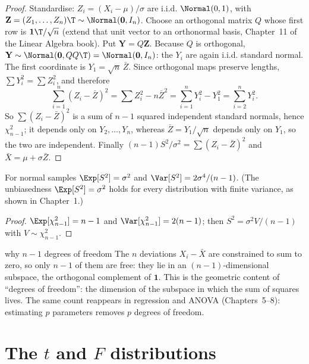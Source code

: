 \begin{proof}
Standardise: $Z_i=(X_i-\mu)/\sigma$ are i.i.d. $\Normal(0,1)$, with $\mathbf{Z}=(Z_1,\dots,Z_n)\T\sim\Normal(\mathbf{0},I_n)$. Choose an orthogonal matrix $Q$ whose first row is $\mathbf{1}\T/\sqrt n$ (extend that unit vector to an orthonormal basis, Chapter~11 of the Linear Algebra book). Put $\mathbf{Y}=Q\mathbf{Z}$. Because $Q$ is orthogonal, $\mathbf{Y}\sim\Normal(\mathbf{0},QQ\T)=\Normal(\mathbf{0},I_n)$: the $Y_i$ are again i.i.d. standard normal. The first coordinate is $Y_1=\sqrt n\,\bar{Z}$. Since orthogonal maps preserve lengths, $\sum Y_i^2=\sum Z_i^2$, and therefore
\[ \sum_{i=1}^n(Z_i-\bar{Z})^2=\sum Z_i^2-n\bar{Z}^2=\sum_{i=1}^nY_i^2-Y_1^2=\sum_{i=2}^nY_i^2. \]
So $\sum(Z_i-\bar{Z})^2$ is a sum of $n-1$ squared independent standard normals, hence $\chi^2_{n-1}$; it depends only on $Y_2,\dots,Y_n$, whereas $\bar{Z}=Y_1/\sqrt n$ depends only on $Y_1$, so the two are independent. Finally $(n-1)S^2/\sigma^2=\sum(Z_i-\bar{Z})^2$ and $\bar{X}=\mu+\sigma\bar{Z}$.
\end{proof}

\begin{corollary}\label{cor:s2}
For normal samples $\Exp[S^2]=\sigma^2$ and $\Var[S^2]=2\sigma^4/(n-1)$. (The unbiasedness $\Exp[S^2]=\sigma^2$ holds for every distribution with finite variance, as shown in Chapter~1.)
\end{corollary}

\begin{proof}
$\Exp[\chi^2_{n-1}]=n-1$ and $\Var[\chi^2_{n-1}]=2(n-1)$; then $S^2=\sigma^2V/(n-1)$ with $V\sim\chi^2_{n-1}$.
\end{proof}

\begin{nuance}{why $n-1$ degrees of freedom}
The $n$ deviations $X_i-\bar{X}$ are constrained to sum to zero, so only $n-1$ of them are free: they lie in an $(n-1)$-dimensional subspace, the orthogonal complement of $\mathbf{1}$. This is the geometric content of ``degrees of freedom'': the dimension of the subspace in which the sum of squares lives. The same count reappears in regression and ANOVA (Chapters~5--8): estimating $p$ parameters removes $p$ degrees of freedom.
\end{nuance}

\section{The $t$ and $F$ distributions}

